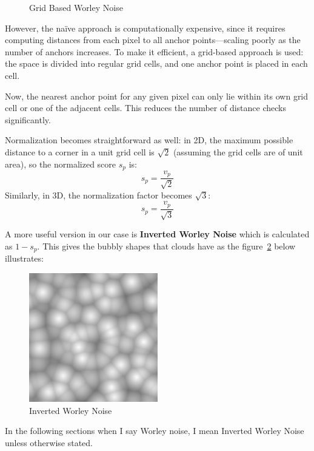 \begin{figure}[H]
\begin{minipage}[t]{0.45\textwidth}
        \caption{Grid Based Worley Noise \cite{wikipedia_worley}}
        \label{fig:worley_grid}
    \end{minipage}
\end{figure}

However, the naïve approach is computationally expensive, since it requires computing distances from each pixel to all anchor points—scaling poorly as the number of anchors increases. To make it efficient, a grid-based approach is used: the space is divided into regular grid cells, and one anchor point is placed in each cell.

Now, the nearest anchor point for any given pixel can only lie within its own grid cell or one of the adjacent cells. This reduces the number of distance checks significantly.

Normalization becomes straightforward as well: in 2D, the maximum possible distance to a corner in a unit grid cell is $\sqrt{2}$ (assuming the grid cells are of unit area), so the normalized score $s_p$ is:
\[
s_p = \frac{v_p}{\sqrt{2}}
\]
Similarly, in 3D, the normalization factor becomes $\sqrt{3}$:
\[
s_p = \frac{v_p}{\sqrt{3}}
\]

A more useful version in our case is \textbf{Inverted Worley Noise} which is calculated as $1 - s_p$. This gives the bubbly shapes that clouds have as the figure~\ref{fig:inverted_worley} below illustrates:
\begin{figure}[H]
    \centering
    \includegraphics[width=0.5\textwidth]{images/inverted_worley.png}
    \caption{Inverted Worley Noise}
    \label{fig:inverted_worley}
\end{figure}

In the following sections when I say Worley noise, I mean Inverted Worley Noise unless otherwise stated.

